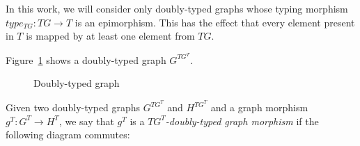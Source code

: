 \begin{remark} In this work, we will consider only doubly-typed graphs whose typing morphism $type_{TG} : TG \rightarrow T$ is an epimorphism. This has the effect that every element present in $T$ is mapped by at least one element from $TG$.
\end{remark}

\begin{example} Figure~\ref{fig:process:doubly-typed-graph} shows a doubly-typed graph $G^{TG^T}$.

\begin{figure}[!ht]
  \centering
  \caption{Doubly-typed graph}\label{fig:process:doubly-typed-graph}
\end{figure}

\end{example}

\begin{definition}
  Given two doubly-typed graphs $G^{TG^T}$ and $H^{TG^T}$ and a graph morphism $g^T : G^T \rightarrow H^T$, we say that $g^T$ is a \emph{$TG^T$-doubly-typed graph morphism} if the following diagram commutes:

\end{definition}


